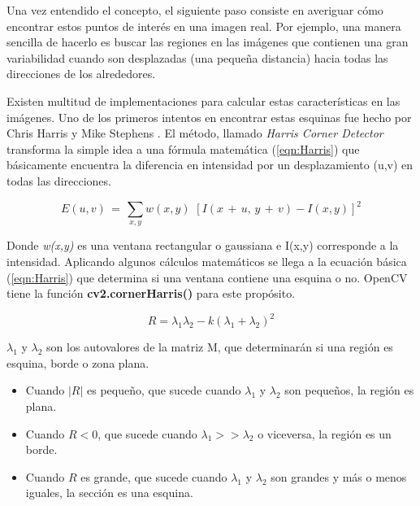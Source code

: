 Una vez entendido el concepto, el siguiente paso consiste en averiguar cómo encontrar estos puntos de interés en una imagen real. Por ejemplo, una manera sencilla de hacerlo es buscar las regiones en las imágenes que contienen una gran variabilidad cuando son desplazadas (una pequeña distancia) hacia todas las direcciones de los alrededores.

Existen multitud de implementaciones para calcular estas características en las imágenes. Uno de los primeros intentos en encontrar estas esquinas fue hecho por Chris Harris y Mike Stephens \parencite{Reference8}. El método, llamado \textit{Harris Corner Detector} transforma la simple idea a una fórmula matemática (\ref{eqn:Harris}) que básicamente encuentra la diferencia en intensidad por un desplazamiento (u,v) en todas las direcciones.

\begin{equation}
E(u,v)\,=\,\sum_{x,y}w(x,y)\,\,[I(x\,+\, u,\, y\,+\, v)-I(x,y)]^{2}
\label{eqn:Harris}
\end{equation}

Donde \textit{w(x,y)} es una ventana rectangular o gaussiana e I(x,y) corresponde a la intensidad. Aplicando algunos cálculos matemáticos se llega a la ecuación básica (\ref{eqn:Harris}) que determina si una ventana contiene una esquina o no. OpenCV tiene la función \textbf{cv2.cornerHarris()} para este propósito.

\begin{equation}
R=\lambda_{1}\lambda_{2}-k(\lambda_{1}+\lambda_{2})^{2}
\label{eqn:Harris2}
\end{equation}

$\lambda_{1}$ y $\lambda_{2}$ son los autovalores de la matriz M, que determinarán si una región es esquina, borde o zona plana.

\begin{itemize}
\item Cuando $|R|$ es pequeño, que sucede cuando $\lambda_{1}$ y $\lambda_{2}$ son pequeños, la región es plana.

\item Cuando $R < 0$, que sucede cuando $\lambda_{1} >> \lambda_{2}$ o viceversa, la región es un borde.

\item Cuando $R$ es grande, que sucede cuando $\lambda_{1}$ y $\lambda_{2}$ son grandes y más o menos iguales, la sección es una esquina.

\end{itemize}

